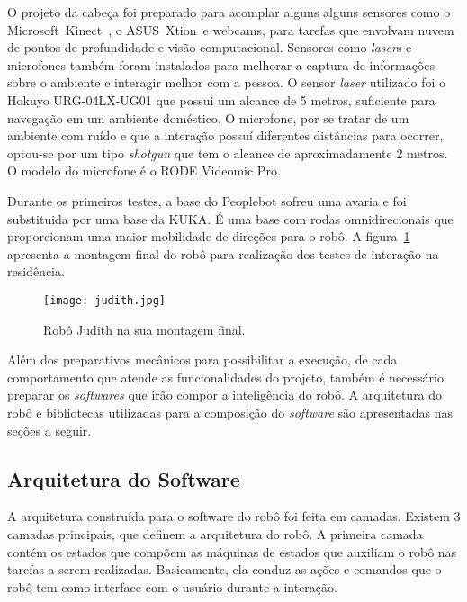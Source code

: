 O projeto da cabeça foi preparado para acomplar alguns alguns sensores como o Microsoft\textregistered\ Kinect\textregistered\ , o ASUS\textregistered\ Xtion\textregistered\ e webcams, para tarefas que envolvam nuvem de pontos de profundidade e visão computacional. Sensores como \emph{laser}s e microfones também foram instalados para melhorar a captura de informações sobre o ambiente e interagir melhor com a pessoa. O sensor \emph{laser} utilizado foi o Hokuyo URG-04LX-UG01 que possui um alcance de 5 metros, suficiente para navegação em um ambiente doméstico. O microfone, por se tratar de um ambiente com ruído e que a interação possuí diferentes distâncias para ocorrer, optou-se por um tipo \emph{shotgun} que tem o alcance de aproximadamente 2 metros. O modelo do microfone é o RODE Videomic Pro.

Durante os primeiros testes, a base do Peoplebot sofreu uma avaria e foi substituida por uma base da KUKA. É uma base com rodas omnidirecionais que proporcionam uma maior mobilidade de direções para o robô. A figura~\ref{fig:newjudith} apresenta a montagem final do robô para realização dos testes de interação na residência.

\begin{figure}[ht!]
	\centering
	\begin{minipage}{0.4\textwidth}
		\caption{Robô Judith na sua montagem final.}
		\texttt{[image: judith.jpg]}
		\label{fig:newjudith}
	\end{minipage}
\end{figure}

Além dos preparativos mecânicos para possibilitar a execução, de cada comportamento que atende as funcionalidades do projeto, também é necessário preparar os \emph{softwares} que irão compor a inteligência do robô. A arquitetura do robô e bibliotecas utilizadas para a composição do \emph{software} são apresentadas nas seções a seguir.

\subsection{Arquitetura do Software}
\label{sec:arquitetura}
A arquitetura construída para o software do robô foi feita em camadas. Existem 3 camadas principais, que definem a arquitetura do robô. A primeira camada contém os estados que compõem as máquinas de estados que auxiliam o robô nas tarefas a serem realizadas. Basicamente, ela conduz as ações e comandos que o robô tem como interface com o usuário durante a interação.

